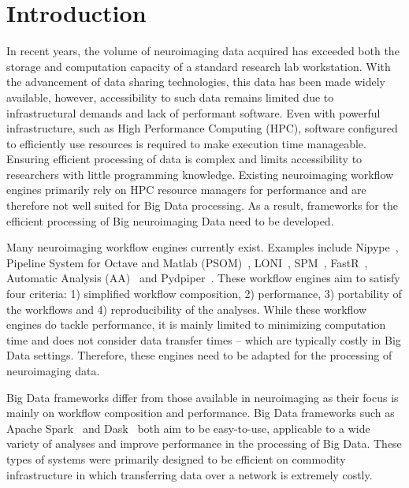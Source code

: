 \chapter{Introduction}

        In recent years, the volume of neuroimaging data acquired has exceeded
        both the storage and computation capacity of a standard research 
        lab workstation. With the advancement of data sharing technologies, 
        this data has been made widely available, however, accessibility to 
        such data remains limited due to infrastructural demands and lack of 
        performant software. Even with powerful infrastructure, such as High
        Performance Computing (HPC), software configured to 
        efficiently use resources is required to make execution time manageable. 
        Ensuring efficient processing of data is 
        complex and limits accessibility to researchers with little programming 
        knowledge. Existing neuroimaging workflow engines primarily rely on HPC
        resource managers for performance and are therefore not well suited for
        Big Data processing. As a result, frameworks for the efficient 
        processing of Big neuroimaging Data need to be developed.
        
        Many neuroimaging workflow engines currently exist. Examples include
        Nipype~\cite{nipype}, Pipeline System for Octave and Matlab 
        (PSOM)~\cite{10.3389/fninf.2012.00007}, LONI~\cite{REX20031033}, 
        SPM~\cite{spm}, FastR~\cite{10.3389/fict.2016.00015},
        Automatic Analysis (AA)~\cite{10.3389/fninf.2014.00090} and 
        Pydpiper~\cite{10.3389/fninf.2014.00067}. These 
        workflow engines aim to satisfy four criteria: 1) simplified
        workflow composition, 2) performance, 3) portability of the workflows 
        and 4) reproducibility of the analyses. While these workflow engines
        do tackle performance, it is mainly limited to minimizing computation
        time and does not consider data transfer times -- which are typically
        costly in Big Data settings. Therefore, these engines need to be adapted
        for the processing of neuroimaging data.

        Big Data frameworks differ from those available in neuroimaging as their
        focus is mainly on workflow composition and performance. Big Data 
        frameworks such as Apache Spark~\cite{Zaharia:2016:ASU:3013530.2934664} 
        and Dask~\cite{rocklin2015dask} both aim to be easy-to-use,
        applicable to a wide variety of analyses and improve performance in the 
        processing of Big Data. These types of systems were primarily designed 
        to be efficient on commodity infrastructure in which transferring data
        over a network is extremely costly.

